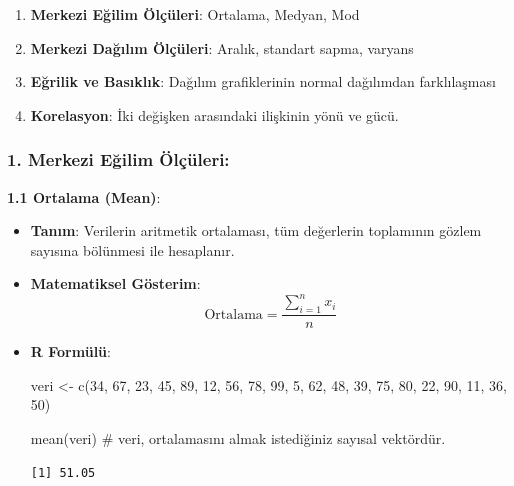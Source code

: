 \documentclass[
  letterpaper,
  DIV=11,
  numbers=noendperiod]{scrartcl}
\newenvironment{Shaded}{\begin{snugshade}}{\end{snugshade}}
\newcommand{\CommentTok}[1]{\textcolor[rgb]{0.37,0.37,0.37}{#1}}
\newcommand{\DecValTok}[1]{\textcolor[rgb]{0.68,0.00,0.00}{#1}}
\newcommand{\FunctionTok}[1]{\textcolor[rgb]{0.28,0.35,0.67}{#1}}
\newcommand{\NormalTok}[1]{\textcolor[rgb]{0.00,0.23,0.31}{#1}}
\newcommand{\OtherTok}[1]{\textcolor[rgb]{0.00,0.23,0.31}{#1}}
\begin{document}
\begin{enumerate}
\def\labelenumi{\arabic{enumi}.}
\item
  \textbf{Merkezi Eğilim Ölçüleri}: Ortalama, Medyan, Mod
\item
  \textbf{Merkezi Dağılım Ölçüleri}: Aralık, standart sapma, varyans
\item
  \textbf{Eğrilik ve Basıklık}: Dağılım grafiklerinin normal dağılımdan
  farklılaşması
\item
  \textbf{Korelasyon}: İki değişken arasındaki ilişkinin yönü ve gücü.
\end{enumerate}

\hypertarget{merkezi-eux11filim-uxf6luxe7uxfcleri}{%
\subsubsection{1. Merkezi Eğilim
Ölçüleri:}\label{merkezi-eux11filim-uxf6luxe7uxfcleri}}

\textbf{1.1 Ortalama (Mean)}:

\begin{itemize}
\item
  \textbf{Tanım}: Verilerin aritmetik ortalaması, tüm değerlerin
  toplamının gözlem sayısına bölünmesi ile hesaplanır.
\item
  \textbf{Matematiksel Gösterim}:
  \[\text{Ortalama} = \frac{\sum_{i=1}^{n} x_i}{n}\]
  \hspace{0pt}\hspace{0pt}
\item
  \textbf{R Formülü}:

\begin{Shaded}
\begin{Highlighting}[]
\NormalTok{veri }\OtherTok{\textless{}{-}} \FunctionTok{c}\NormalTok{(}\DecValTok{34}\NormalTok{, }\DecValTok{67}\NormalTok{, }\DecValTok{23}\NormalTok{, }\DecValTok{45}\NormalTok{, }\DecValTok{89}\NormalTok{, }\DecValTok{12}\NormalTok{, }\DecValTok{56}\NormalTok{, }\DecValTok{78}\NormalTok{, }\DecValTok{99}\NormalTok{, }\DecValTok{5}\NormalTok{, }\DecValTok{62}\NormalTok{, }\DecValTok{48}\NormalTok{, }\DecValTok{39}\NormalTok{, }\DecValTok{75}\NormalTok{, }\DecValTok{80}\NormalTok{, }\DecValTok{22}\NormalTok{, }\DecValTok{90}\NormalTok{, }\DecValTok{11}\NormalTok{, }\DecValTok{36}\NormalTok{, }\DecValTok{50}\NormalTok{)}

\FunctionTok{mean}\NormalTok{(veri)  }\CommentTok{\# veri, ortalamasını almak istediğiniz sayısal vektördür.}
\end{Highlighting}
\end{Shaded}

\begin{verbatim}
[1] 51.05
\end{verbatim}
\end{itemize}
\end{document}

